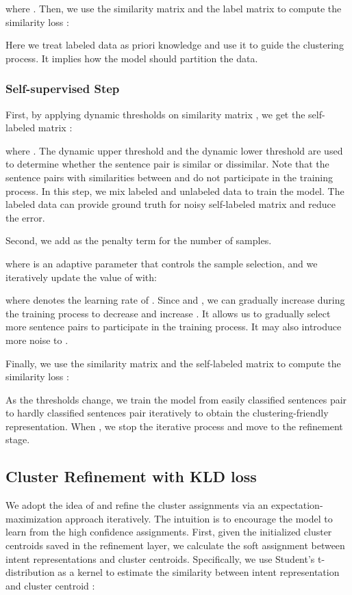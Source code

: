 \documentclass[letterpaper]{article} \usepackage{aaai20}  \usepackage{times}  \usepackage{helvet} \usepackage{courier}  \usepackage[hyphens]{url}  \usepackage{graphicx} \urlstyle{rm} \def\UrlFont{\rm}  \usepackage{graphicx}  \frenchspacing  \setlength{\pdfpagewidth}{8.5in}  \setlength{\pdfpageheight}{11in}
\newcommand{\citet}[1]{\citeauthor{#1} \shortcite{#1}}
\begin{document}
where . Then, we use the similarity matrix  and the label matrix  to compute the similarity loss  : 

Here we treat labeled data as priori knowledge and use it to guide the clustering process. It implies how the model should partition the data. 

\subsubsection{Self-supervised Step} First, by applying dynamic thresholds on similarity matrix , we get the self-labeled matrix :

where . The dynamic upper threshold  and the dynamic lower threshold  are used to determine whether the sentence pair is similar or dissimilar. Note that the sentence pairs with similarities between  and  do not participate in the training process. In this step, we mix labeled and unlabeled data to train the model. The labeled data can provide ground truth for noisy self-labeled matrix  and reduce the error.

Second, we add  as the penalty term for the number of samples. 

where  is an adaptive parameter that controls the sample selection, and we iteratively update the value of  with:

where  denotes the learning rate of . Since  and , we can gradually increase  during the training process to decrease  and increase . It allows us to gradually select more sentence pairs to participate in the training process. It may also introduce more noise to .

Finally, we use the similarity matrix  and the self-labeled matrix  to compute the similarity loss  : 

As the thresholds change, we train the model from easily classified sentences pair to hardly classified sentences pair iteratively to obtain the clustering-friendly representation. When , we stop the iterative process and move to the refinement stage. 


\subsection{Cluster Refinement with KLD loss}
We adopt the idea of \citet{xie2016unsupervised} and refine the cluster assignments via an expectation-maximization approach iteratively. The intuition is to encourage the model to learn from the high confidence assignments. First, given the initialized cluster centroids  saved in the refinement layer, we calculate the soft assignment between intent representations and cluster centroids. Specifically, we use Student’s t-distribution as a kernel to estimate the similarity between intent representation  and cluster centroid :
\end{document}

